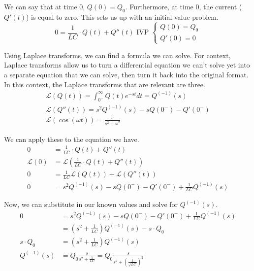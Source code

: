 \documentclass[12pt]{article}
\begin{document}
    We can say that at time 0, $Q(0) = Q_0$.
    Furthermore, at time 0, the current ($Q'(t)$) is equal to zero.
    This sets us up with an initial value problem.
    \begin{equation}
        0 = \frac{1}{LC} \cdot Q(t) + Q''(t) \text{ IVP } \begin{cases}
            Q(0) = Q_0\\
            Q'(0) = 0
        \end{cases}
    \end{equation}

    Using Laplace transforms, we can find a formula we can solve.
    For context, Laplace transforms allow us to turn a differential equation we can't solve yet into a separate equation that we can solve, then turn it back into the original format.
    In this context, the Laplace transforms that are relevant are three.
    \begin{gather}
        \mathcal{L} (Q(t)) = \int_{0^-}^{\infty} Q(t) e^{-st} dt = Q^{(-1)}(s)\\
        \mathcal{L} (Q''(t)) = s^2 Q^{(-1)}(s) - s Q(0^-) - Q'(0^-)\\
        \mathcal{L} (\cos(\omega t)) = \frac{s}{s^2 + \omega^2}
    \end{gather}

    We can apply these to the equation we have.
    \begin{align}
        0   &=  \frac{1}{LC} \cdot Q(t) + Q''(t)\\
        \mathcal{L} (0) &=  \mathcal{L} (\frac{1}{LC} \cdot Q(t) + Q''(t))\\
        0   &=  \frac{1}{LC} \mathcal{L} (Q(t)) + \mathcal{L} (Q''(t))\\
        0   &=  s^2 Q^{(-1)}(s) - s Q(0^-) - Q'(0^-) + \frac{1}{LC}Q^{(-1)}(s)
    \end{align}

    Now, we can substitute in our known values and solve for $Q^{(-1)}(s)$.
    \begin{align}
        0   &=  s^2 Q^{(-1)}(s) - s Q(0^-) - Q'(0^-) + \frac{1}{LC}Q^{(-1)}(s)\\
            &=  (s^2 + \frac{1}{LC}) Q^{(-1)}(s) - s \cdot Q_0\\
        s \cdot Q_0 &=  (s^2 + \frac{1}{LC}) Q^{(-1)}(s)\\
        Q^{(-1)}(s) &=  Q_0 \frac{s}{s^2 + \frac{1}{LC}}
            =   Q_0 \frac{s}{s^2 + (\frac{1}{\sqrt{LC}})^2}
    \end{align}
\end{document}
